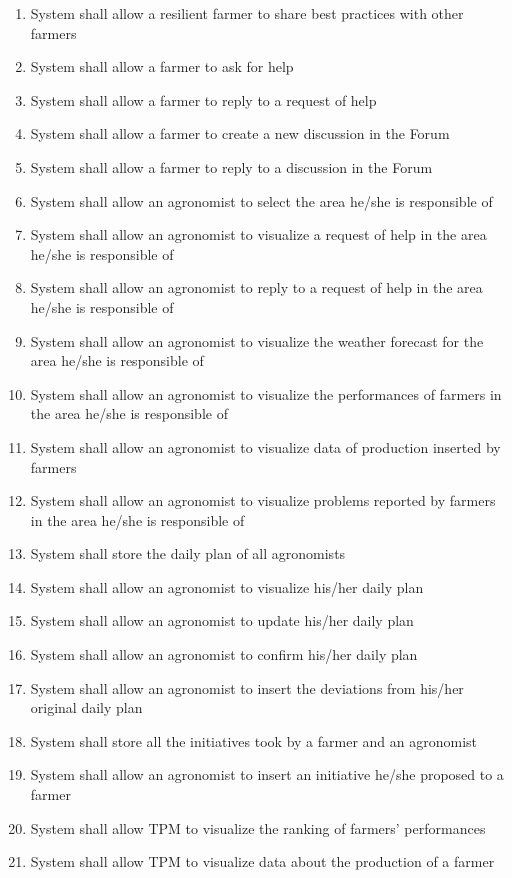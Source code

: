 \begin{enumerate} [label=\textbf{R.\arabic*}]
    \item System shall allow a resilient farmer to share best practices with other farmers
    \item System shall allow a farmer to ask for help
    \item System shall allow a farmer to reply to a request of help
    \item System shall allow a farmer to create a new discussion in the Forum
    \item System shall allow a farmer to reply to a discussion in the Forum
    \item System shall allow an agronomist to select the area he/she is responsible of
    \item System shall allow an agronomist to visualize a request of help in the area he/she is responsible of
    \item System shall allow an agronomist to reply to a request of help in the area he/she is responsible of
    \item System shall allow an agronomist to visualize the weather forecast for the area he/she is responsible of
    \item System shall allow an agronomist to visualize the performances of farmers in the area he/she is responsible of
    \item System shall allow an agronomist to visualize data of production inserted by farmers
    \item System shall allow an agronomist to visualize problems reported by farmers in the area he/she is responsible of
    \item System shall store the daily plan of all agronomists
    \item System shall allow an agronomist to visualize his/her daily plan
    \item System shall allow an agronomist to update his/her daily plan
    \item System shall allow an agronomist to confirm his/her daily plan
    \item System shall allow an agronomist to insert the deviations from his/her original daily plan
    \item System shall store all the initiatives took by a farmer and an agronomist
    \item System shall allow an agronomist to insert an initiative he/she proposed to a farmer
    \item System shall allow TPM to visualize the ranking of farmers’ performances
    \item System shall allow TPM to visualize data about the production of a farmer

\end{enumerate}
